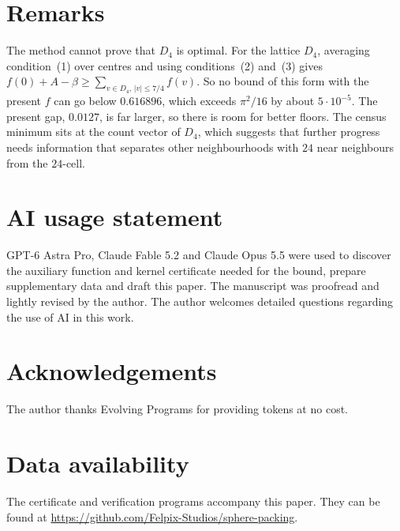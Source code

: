 \documentclass[11pt]{amsart}
\numberwithin{equation}{section}
\theoremstyle{remark}
\begin{document}
\section{Remarks}

The method cannot prove that $D_4$ is optimal. For the lattice $D_4$, averaging condition~(1) over centres and using conditions~(2) and~(3) gives $f(0)+A-\beta\ge\sum_{v\in D_4,\,|v|\le7/4}f(v)$. So no bound of this form with the present $f$ can go below $0.616896$, which exceeds $\pi^2/16$ by about $5\cdot10^{-5}$. The present gap, $0.0127$, is far larger, so there is room for better floors. The census minimum sits at the count vector of $D_4$, which suggests that further progress needs information that separates other neighbourhoods with $24$ near neighbours from the $24$-cell.

\section*{AI usage statement}

GPT-6 Astra Pro, Claude Fable 5.2 and Claude Opus 5.5 were used to discover the auxiliary function and kernel certificate needed for the bound, prepare supplementary data and draft this paper. The manuscript was proofread and lightly revised by the author. The author welcomes detailed questions regarding the use of AI in this work.

\section*{Acknowledgements}

The author thanks Evolving Programs for providing tokens at no cost.

\section*{Data availability}

The certificate and verification programs accompany this paper. They can be found at \url{https://github.com/Felpix-Studios/sphere-packing}.
\end{document}
